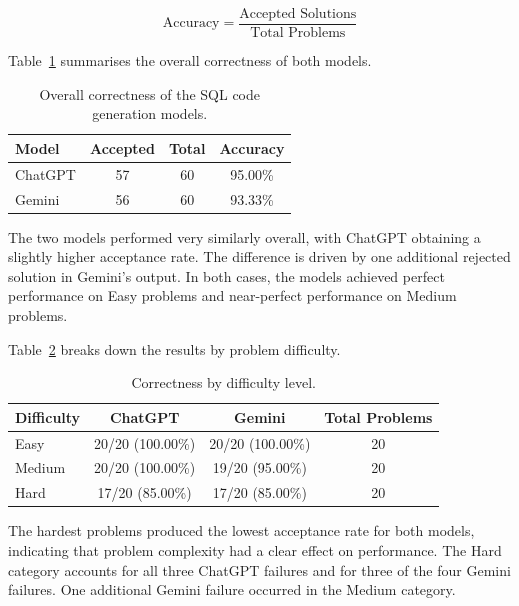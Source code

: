 \documentclass[11pt,a4paper]{article}
\begin{document}
    \[
    \text{Accuracy} = \frac{\text{Accepted Solutions}}{\text{Total Problems}}
    \]

    Table~\ref{tab:codegen-overall} summarises the overall correctness of both models.

    \begin{table}[htbp]
    \centering
    \begin{tabular}{lccc}
    \hline
    \textbf{Model} & \textbf{Accepted} & \textbf{Total} & \textbf{Accuracy} \\
    \hline
    ChatGPT & 57 & 60 & 95.00\% \\
    Gemini  & 56 & 60 & 93.33\% \\
    \hline
    \end{tabular}
    \caption{Overall correctness of the SQL code generation models.}
    \label{tab:codegen-overall}
    \end{table}

    The two models performed very similarly overall, with ChatGPT obtaining a slightly higher acceptance rate. The difference is driven by one additional rejected solution in Gemini's output. In both cases, the models achieved perfect performance on Easy problems and near-perfect performance on Medium problems.

    Table~\ref{tab:codegen-difficulty} breaks down the results by problem difficulty.

    \begin{table}[htbp]
    \centering
    \begin{tabular}{lccc}
    \hline
    \textbf{Difficulty} & \textbf{ChatGPT} & \textbf{Gemini} & \textbf{Total Problems} \\
    \hline
    Easy   & 20/20 (100.00\%) & 20/20 (100.00\%) & 20 \\
    Medium & 20/20 (100.00\%) & 19/20 (95.00\%)  & 20 \\
    Hard   & 17/20 (85.00\%)  & 17/20 (85.00\%)  & 20 \\
    \hline
    \end{tabular}
    \caption{Correctness by difficulty level.}
    \label{tab:codegen-difficulty}
    \end{table}

    The hardest problems produced the lowest acceptance rate for both models, indicating that problem complexity had a clear effect on performance. The Hard category accounts for all three ChatGPT failures and for three of the four Gemini failures. One additional Gemini failure occurred in the Medium category.
\end{document}
